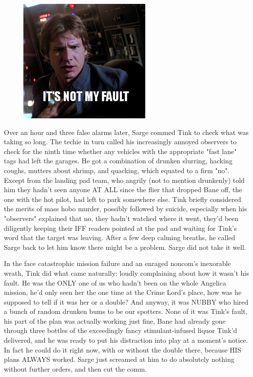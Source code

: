 \begin{figure}
	\begin{center}
		\includegraphics[width=\figwidth]{pics/19/35.png}
	\end{center}
\end{figure}
Over an hour and three false alarms later, Sarge commed Tink to check what was taking so long. 
The techie in turn called his increasingly annoyed observers to check for the ninth time whether any vehicles with the appropriate "fast lane" tags had left the garages. 
He got a combination of drunken slurring, hacking coughs, mutters about shrimp, and quacking, which equated to a firm "no". 
Except from the landing pad team, who angrily (not to mention drunkenly) told him they hadn't seen anyone AT ALL since the flier that dropped Bane off, the one with the hot pilot, had left to park somewhere else. 
Tink briefly considered the merits of mass hobo murder, possibly followed by suicide, especially when his "observers" explained that no, they hadn't watched where it went, they'd been diligently keeping their IFF readers pointed at the pad and waiting for Tink's word that the target was leaving. 
After a few deep calming breaths, he called Sarge back to let him know there might be a problem. 
Sarge did not take it well.

In the face catastrophic mission failure and an enraged noncom's inexorable wrath, Tink did what came naturally: 
loudly complaining about how it wasn't his fault. 
He was the ONLY one of us who hadn't been on the whole Angelica mission, he'd only seen her the one time at the Crime Lord's place, how was he supposed to tell if it was her or a double? 
And anyway, it was NUBBY who hired a bunch of random drunken bums to be our spotters. 
None of it was Tink's fault, his part of the plan was actually working just fine, Bane had already gone through three bottles of the exceedingly fancy stimulant-infused liquor Tink'd delivered, and he was ready to put his distraction into play at a moment's notice. 
In fact he could do it right now, with or without the double there, because HIS plans ALWAYS worked. 
Sarge just screamed at him to do absolutely nothing without further orders, and then cut the comm. 


